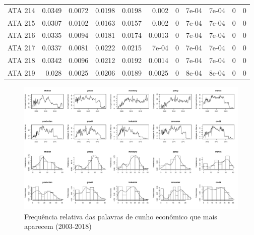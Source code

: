 \begin{landscape}
\begin{longtable}{rrrrrrrrrrr}
  ATA 214 & 0.0349 & 0.0072 & 0.0198 & 0.0198 & 0.002 & 0 & 7e-04 & 7e-04 & 0 & 0 \\ 
  ATA 215 & 0.0307 & 0.0102 & 0.0163 & 0.0157 & 0.002 & 0 & 7e-04 & 7e-04 & 0 & 0 \\ 
  ATA 216 & 0.0335 & 0.0094 & 0.0181 & 0.0174 & 0.0013 & 0 & 7e-04 & 7e-04 & 0 & 0 \\ 
  ATA 217 & 0.0337 & 0.0081 & 0.0222 & 0.0215 & 7e-04 & 0 & 7e-04 & 7e-04 & 0 & 0 \\ 
  ATA 218 & 0.0342 & 0.0096 & 0.0212 & 0.0192 & 0.0014 & 0 & 7e-04 & 7e-04 & 0 & 0 \\ 
  ATA 219 & 0.028 & 0.0025 & 0.0206 & 0.0189 & 0.0025 & 0 & 8e-04 & 8e-04 & 0 & 0 \\ 
   \hline
\end{longtable}
\end{landscape}

\begin{landscape}
\begin{figure}
    \centering
    \includegraphics[width=1.5\textwidth]{capitulos/figures/analiseeconomicageral.pdf}
    \caption{Frequência relativa das palavras de cunho econômico que mais aparecem (2003-2018)}
    \label{fig:analiseeconomicageral}
\end{figure}
\end{landscape}

